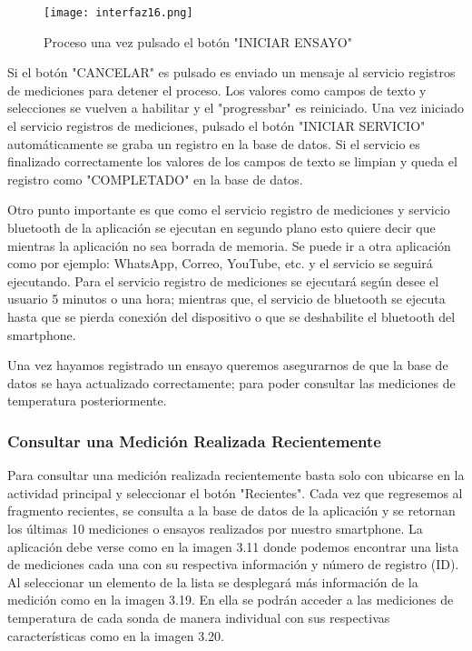\begin{figure}[H]
	\centering
	\texttt{[image: interfaz16.png]}
	\caption{Proceso una vez pulsado el botón "INICIAR ENSAYO"}
\end{figure}
 
\par \noindent
Si el botón "CANCELAR" es pulsado es enviado un mensaje al servicio registros de mediciones para detener el proceso. Los valores como campos de texto y selecciones se vuelven a habilitar y el "progressbar" es reiniciado. Una vez iniciado el servicio registros de mediciones, pulsado el botón "INICIAR SERVICIO" automáticamente se graba un registro en la base de datos. Si el servicio es finalizado correctamente los valores de los campos de texto se limpian y queda el registro como "COMPLETADO" en la base de datos. 

\par \noindent
Otro punto importante es que como el servicio registro de mediciones y servicio bluetooth de la aplicación se ejecutan en segundo plano esto quiere decir que mientras la aplicación no sea borrada de memoria. Se puede ir a otra aplicación como por ejemplo: WhatsApp, Correo, YouTube, etc. y el servicio se seguirá ejecutando. Para el servicio registro de mediciones se ejecutará según desee el usuario 5 minutos o una hora; mientras que, el servicio de bluetooth se ejecuta hasta que se pierda conexión del dispositivo o que se deshabilite el bluetooth del smartphone.

\par \noindent
Una vez hayamos registrado un ensayo queremos asegurarnos de que la base de datos se haya actualizado correctamente; para poder consultar las mediciones de temperatura posteriormente.

\subsubsection{Consultar una Medición Realizada Recientemente}

\par 
Para consultar una medición realizada recientemente basta solo con ubicarse en la actividad principal y seleccionar el botón "Recientes". Cada vez que regresemos al fragmento recientes, se consulta a la base de datos de la aplicación y se retornan los últimas 10 mediciones o ensayos realizados por nuestro smartphone. La aplicación debe verse como en la imagen 3.11 donde podemos encontrar una lista de mediciones cada una con su respectiva información y número de registro (ID). Al seleccionar un elemento de la lista se desplegará más información de la medición como en la imagen 3.19. En ella se podrán acceder a las mediciones de temperatura de cada sonda de manera individual con sus respectivas características como en la imagen 3.20.

